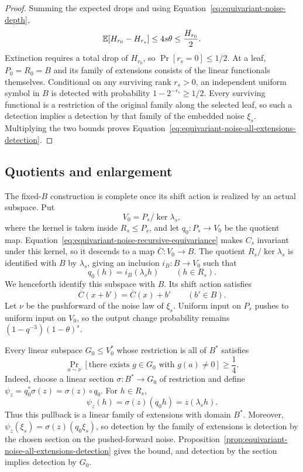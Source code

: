 \begin{proof}
Summing the expected drops and using Equation~\eqref{eq:equivariant-noise-depth},
\[
 \mathbb E[H_{r_0}-H_{r_s}]\le4s\theta\le\frac{H_{r_0}}2.
\]
Extinction requires a total drop of $H_{r_0}$, so
$\Pr[r_s=0]\le1/2$.  At a leaf, $P_0=R_0=B$ and its family of extensions consists of
the linear functionals themselves.  Conditional on any surviving rank $r_s>0$,
an independent uniform symbol in $B$ is detected with probability
$1-2^{-r_s}\ge1/2$.  Every surviving functional is a restriction of the
original family along the selected leaf, so such a detection implies a
detection by that family of the embedded noise $\xi_s$.  Multiplying the
two bounds proves Equation~\eqref{eq:equivariant-noise-all-extensions-detection}.
\end{proof}

\subsection{Quotients and enlargement}\label{subsec:equivariant-noise-enlargement}

The fixed-$B$ construction is complete once its shift action is realized
by an actual subspace.  Put
\[
 V_0=P_s/\ker\lambda_s,
\]
where the kernel is taken inside $R_s\le P_s$, and let
$q_0:P_s\to V_0$ be the quotient map.
Equation~\eqref{eq:equivariant-noise-recursive-equivariance} makes $C_s$ invariant under
this kernel, so it descends to a map $\overline C:V_0\to B$.
The quotient $R_s/\ker\lambda_s$ is identified with $B$ by $\lambda_s$,
giving an inclusion $i_B:B\to V_0$ such that
\[
 q_0(h)=i_B(\lambda_s h)\qquad(h\in R_s).
\]
We henceforth identify this subspace with $B$.  Its shift action satisfies
\[
 \overline C(x+b')=\overline C(x)+b'
 \qquad(b'\in B).
\]
Let $\nu$ be the pushforward of the noise law of $\xi_s$.
Uniform input on $P_s$ pushes to uniform input on $V_0$, so the output
change probability remains $(1-q^{-3})(1-\theta)^s$.

Every linear subspace $G_0\le V_0^*$ whose restriction is all of $B^*$
satisfies
\begin{equation}\label{eq:equivariant-noise-base-detection}
 \Pr_{a\sim\nu}[\text{there exists }g\in G_0\text{ with }g(a)\ne0]
 \ge\frac14.
\end{equation}
Indeed, choose a linear section $\sigma:B^*\to G_0$ of restriction and
define $\psi_z=q_0^*\sigma(z)=\sigma(z)\circ q_0$.  For $h\in R_s$,
\[
 \psi_z(h)=\sigma(z)(q_0h)=z(\lambda_s h).
\]
Thus this pullback is a linear family of extensions with domain $B^*$.  Moreover,
$\psi_z(\xi_s)=\sigma(z)(q_0\xi_s)$, so detection by the family of extensions is detection
by the chosen section on the pushed-forward noise.
Proposition~\ref{prop:equivariant-noise-all-extensions-detection} gives the bound, and
detection by the section implies detection by $G_0$.

